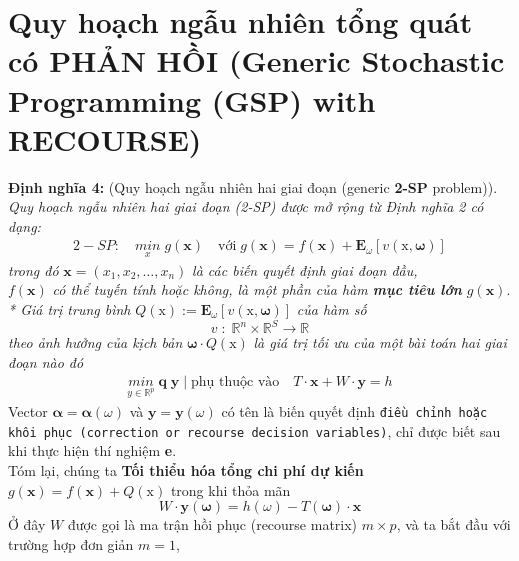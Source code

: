 \documentclass[a4paper]{article}
\begin{document}
\section{Quy hoạch ngẫu nhiên tổng quát có PHẢN HỒI (Generic Stochastic Programming (GSP) with RECOURSE) }
	\textbf{Định nghĩa 4:} (Quy hoạch ngẫu nhiên hai giai đoạn (generic \textbf{2-SP} problem)). \textit{Quy hoạch
    ngẫu nhiên hai giai đoạn (2-SP) được mở rộng từ Định nghĩa 2 có dạng:}
    \begin{gather}
        2-SP: \quad \underset{x}{min} \; g(\boldsymbol{x}) \quad \text{với} \; g(\boldsymbol{x})=f(\boldsymbol{x}) + \mathbf{E}_{\omega}[v(\boldsymbol{\mathrm{x}},\boldsymbol{\omega})]
    \end{gather}
    \textit{trong đó} $\boldsymbol{x}=(x_1, x_2, \dots , x_n)$ \textit{là các biến quyết định giai đoạn đầu,}\\
    $f(\boldsymbol{x})$ \textit{có thể tuyến tính hoặc không, là một phần của hàm \textbf{mục tiêu lớn} $g(\boldsymbol{x})$}.\\
    \textit{* Giá trị trung bình} $Q(\boldsymbol{\mathrm{x}}) \mathrel{:=} \mathbf{E}_{\omega}[v(\boldsymbol{\mathrm{x}},\boldsymbol{\omega})]$
    \textit{của hàm số}
    \begin{displaymath}
        v \; : \; \mathbb{R}^n \times \mathbb{R}^S \rightarrow \mathbb{R}
    \end{displaymath} 
    \textit{theo ảnh hưởng của kịch bản} $\boldsymbol{\omega} \cdot Q(\boldsymbol{\mathrm{x}})$
    \textit{là giá trị tối ưu của một bài toán hai giai đoạn nào đó}
    \begin{gather}
        \underset{y \in  \mathbb{R}^p}{min} \; \boldsymbol{q} \; \boldsymbol{y} \; \vert \; \text{phụ thuộc vào} \quad T \cdot \boldsymbol{x} + W \cdot \boldsymbol{y} = h
    \end{gather}
    Vector $\boldsymbol{\alpha}=\boldsymbol{\alpha}(\omega)$ và $\boldsymbol{y}=\boldsymbol{y}(\omega)$ có tên là
    biến quyết định \texttt{điều chỉnh hoặc khôi phục (correction or recourse decision variables)}, chỉ được biết sau khi
    thực hiện thí nghiệm \textbf{e}.\\
    Tóm lại, chúng ta \textbf{Tối thiểu hóa tổng chi phí dự kiến} $g(\boldsymbol{x})=f(\boldsymbol{x})+Q(\boldsymbol{\mathrm{x}})$ trong khi thỏa mãn
    \begin{displaymath}
        W \cdot \boldsymbol{y(\omega)} = h(\omega) - T(\boldsymbol{\omega}) \cdot \boldsymbol{x}
    \end{displaymath}
    Ở đây $W$ được gọi là ma trận hồi phục (recourse matrix) $m \times p$, và ta bắt đầu với trường hợp đơn giản $m = 1$,\\
\end{document}
